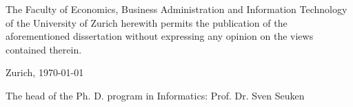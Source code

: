 

\begin{titlepage}

\setlength{\parindent}{0pt} %

\normalsize
The Faculty of Economics, Business Administration and Information Technology of the University of Zurich herewith permits the publication of the aforementioned dissertation without expressing any opinion on the views contained therein.

\vspace{1cm}
Zurich, \today

\vspace{2cm}
The head of the Ph. D. program in Informatics: Prof. Dr. Sven Seuken
%
\newpage
\thispagestyle{empty}
\quad
\newpage
\setcounter{page}{1}

\end{titlepage}
